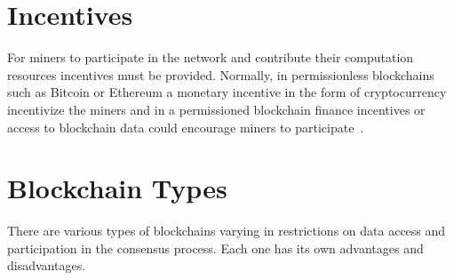 \begin{table}[]
  \centering
  \caption{Blockchain consensus mechanisms. Adapted and modified from~\cite{bl_consensus,Vukolić2016}}
  \label{table:blockchain_consensus}
\end{table}

\section{Incentives}\label{blockchain:incentives}

For miners to participate in the network and contribute their computation resources incentives must be provided.
Normally, in permissionless blockchains such as Bitcoin or Ethereum a monetary incentive in the form of cryptocurrency
incentivize the miners and in a permissioned blockchain finance incentives or access to blockchain data could encourage miners to participate~\cite{deloitte}.

\section{Blockchain Types}\label{blockchain:blockchain_types}

There are various types of blockchains varying in restrictions on data access and participation in the consensus process.
Each one has its own advantages and disadvantages.

